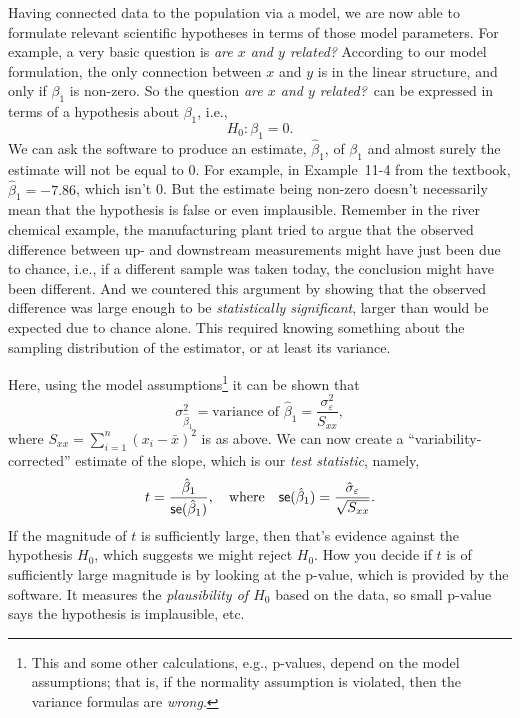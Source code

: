 \documentclass[a4paper, 12pt]{article}
\theoremstyle{plain}
\theoremstyle{definition}
\theoremstyle{remark}
\newcommand{\eps}{\varepsilon}
\begin{document}
Having connected data to the population via a model, we are now able to formulate relevant scientific hypotheses in terms of those model parameters.  For example, a very basic question is {\em are $x$ and $y$ related?}  According to our model formulation, the only connection between $x$ and $y$ is in the linear structure, and only if $\beta_1$ is non-zero.  So the question {\em are $x$ and $y$ related?}~can be expressed in terms of a hypothesis about $\beta_1$, i.e., 
\[ H_0: \beta_1 = 0. \]
We can ask the software to produce an estimate, $\hat\beta_1$, of $\beta_1$ and almost surely the estimate will not be equal to 0.  For example, in Example~11-4 from the textbook, $\hat\beta_1 = -7.86$, which isn't 0.  But the estimate being non-zero doesn't necessarily mean that the hypothesis is false or even implausible.  Remember in the river chemical example, the manufacturing plant tried to argue that the observed difference between up- and downstream measurements might have just been due to chance, i.e., if a different sample was taken today, the conclusion might have been different.  And we countered this argument by showing that the observed difference was large enough to be {\em statistically significant}, larger than would be expected due to chance alone.  This required knowing something about the sampling distribution of the estimator, or at least its variance.  

Here, using the model assumptions\footnote{This and some other calculations, e.g., p-values, depend on the model assumptions; that is, if the normality assumption is violated, then the variance formulas are {\em wrong}.} it can be shown that 
\[ \sigma_{\hat\beta_1}^2 = \text{variance of $\hat\beta_1$} = \frac{\sigma_\eps^2}{S_{xx}}, \]
where $S_{xx} = \sum_{i=1}^n (x_i - \bar x)^2$ is as above.  We can now create a ``variability-corrected'' estimate of the slope, which is our {\em test statistic}, namely, 
\[ t = \frac{\hat\beta_1}{{\sf se}(\hat\beta_1)}, \quad \text{where} \quad {\sf se}(\hat\beta_1) = \frac{\hat\sigma_\eps}{\sqrt{S_{xx}}}. \]
If the magnitude of $t$ is sufficiently large, then that's evidence against the hypothesis $H_0$, which suggests we might reject $H_0$.  How you decide if $t$ is of sufficiently large magnitude is by looking at the p-value, which is provided by the software.  It measures the {\em plausibility of $H_0$} based on the data, so small p-value says the hypothesis is implausible, etc.  
\end{document}
